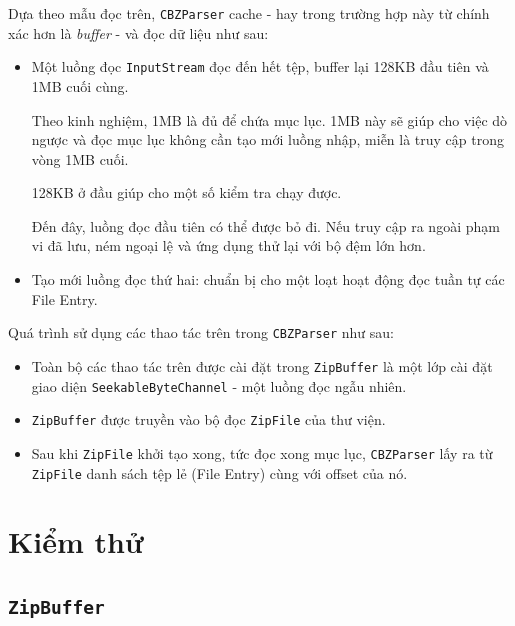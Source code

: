 \documentclass[../../thesis]{subfiles}
\begin{document}
Dựa theo mẫu đọc trên, \texttt{CBZParser} cache - hay trong trường hợp này từ
chính xác hơn là \emph{buffer} - và đọc dữ liệu như sau:

\begin{itemize}
    \item
        Một luồng đọc \texttt{InputStream} đọc đến hết tệp, buffer lại 128KB đầu
        tiên và 1MB cuối cùng.

        Theo kinh nghiệm, 1MB là đủ để chứa mục lục. 1MB này sẽ giúp cho việc dò
        ngược và đọc mục lục không cần tạo mới luồng nhập, miễn là truy cập
        trong vòng 1MB cuối.

        128KB ở đầu giúp cho một số kiểm tra chạy được.

        Đến đây, luồng đọc đầu tiên có thể được bỏ đi. Nếu truy cập ra ngoài
        phạm vi đã lưu, ném ngoại lệ và ứng dụng thử lại với bộ đệm lớn hơn.
    \item
        Tạo mới luồng đọc thứ hai: chuẩn bị cho một loạt hoạt động đọc tuần tự
        các File Entry.
\end{itemize}

Quá trình sử dụng các thao tác trên trong \texttt{CBZParser} như sau:

\begin{itemize}
    \item
        Toàn bộ các thao tác trên được cài đặt trong \texttt{ZipBuffer} là một
        lớp cài đặt giao diện \texttt{SeekableByteChannel} - một luồng đọc ngẫu
        nhiên.
    \item
        \texttt{ZipBuffer} được truyền vào bộ đọc \texttt{ZipFile} của thư viện.
    \item
        Sau khi \texttt{ZipFile} khởi tạo xong, tức đọc xong mục lục,
        \texttt{CBZParser} lấy ra từ \texttt{ZipFile} danh sách tệp lẻ (File
        Entry) cùng với offset của nó.
\end{itemize}



\section{Kiểm thử}\label{sec:testing}

\subsection{\texttt{ZipBuffer}}
\end{document}

